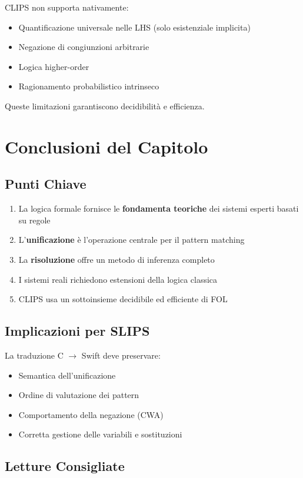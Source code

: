 CLIPS non supporta nativamente:
\begin{itemize}
\item Quantificazione universale nelle LHS (solo esistenziale implicita)
\item Negazione di congiunzioni arbitrarie
\item Logica higher-order
\item Ragionamento probabilistico intrinseco
\end{itemize}

Queste limitazioni garantiscono decidibilità e efficienza.

\section{Conclusioni del Capitolo}

\subsection{Punti Chiave}

\begin{enumerate}
\item La logica formale fornisce le \textbf{fondamenta teoriche} dei sistemi esperti basati su regole
\item L'\textbf{unificazione} è l'operazione centrale per il pattern matching
\item La \textbf{risoluzione} offre un metodo di inferenza completo
\item I sistemi reali richiedono estensioni della logica classica
\item CLIPS usa un sottoinsieme decidibile ed efficiente di FOL
\end{enumerate}

\subsection{Implicazioni per SLIPS}

La traduzione C $\rightarrow$ Swift deve preservare:
\begin{itemize}
\item Semantica dell'unificazione
\item Ordine di valutazione dei pattern
\item Comportamento della negazione (CWA)
\item Corretta gestione delle variabili e sostituzioni
\end{itemize}

\subsection{Letture Consigliate}


